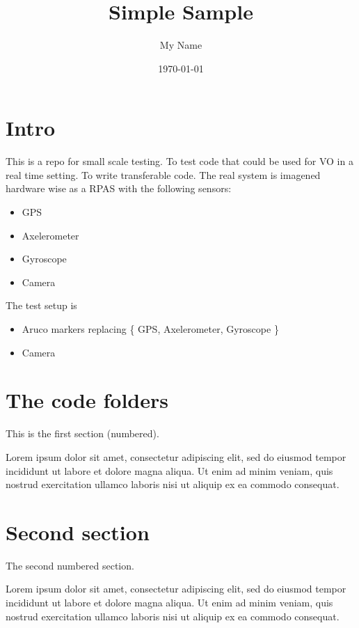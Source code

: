 \documentclass[a4paper,12pt]{article}
\title{Simple Sample} %
\author{My Name} %
\date{\today} %
\begin{document}
\maketitle
\newcommand\shortlorem{Lorem ipsum dolor sit amet, consectetur adipiscing elit, sed do eiusmod tempor incididunt ut labore et dolore magna aliqua. Ut enim ad minim veniam, quis nostrud exercitation ullamco laboris nisi ut aliquip ex ea commodo consequat.}


\section*{Intro}

This is a repo for small scale testing. To test code that could be used for VO in a real time setting.
To write transferable code.
The real system is imagened hardware wise  as a RPAS with the following sensors:
\begin{itemize}
  \item GPS
  \item Axelerometer
  \item Gyroscope
  \item Camera
\end{itemize}
The test setup is 
\begin{itemize}
  \item Aruco markers replacing \{ GPS, Axelerometer, Gyroscope \}
  \item Camera
\end{itemize}




\tableofcontents


\section{The code folders}
This is the first section (numbered).


\shortlorem

\section{Second section}
The second numbered section.

\shortlorem
\end{document}
